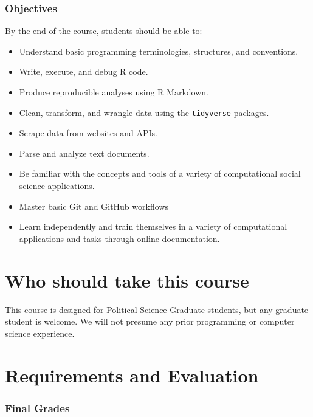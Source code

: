 \documentclass[]{book}
\providecommand{\tightlist}{%
  \setlength{\itemsep}{0pt}\setlength{\parskip}{0pt}}
\begin{document}
\subsubsection*{Objectives}\label{objectives}

By the end of the course, students should be able to:

\begin{itemize}
\tightlist
\item
  Understand basic programming terminologies, structures, and
  conventions.
\item
  Write, execute, and debug R code.
\item
  Produce reproducible analyses using R Markdown.
\item
  Clean, transform, and wrangle data using the \texttt{tidyverse}
  packages.
\item
  Scrape data from websites and APIs.
\item
  Parse and analyze text documents.
\item
  Be familiar with the concepts and tools of a variety of computational
  social science applications.
\item
  Master basic Git and GitHub workflows
\item
  Learn independently and train themselves in a variety of computational
  applications and tasks through online documentation.
\end{itemize}

\section{Who should take this course}\label{who-should-take-this-course}

This course is designed for Political Science Graduate students, but any
graduate student is welcome. We will not presume any prior programming
or computer science experience.

\section{Requirements and Evaluation}\label{requirements-and-evaluation}

\subsubsection*{Final Grades}\label{final-grades}
\end{document}
